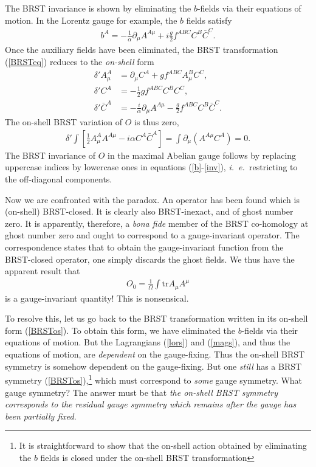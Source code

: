 \documentclass[a4paper,a4paper]{article}
\begin{document}
The BRST invariance is shown by eliminating the $b$-fields via their equations of motion. In the Lorentz gauge for example, the $b$ fields satisfy 
\begin{gather} \label{b}
b^A = -\frac{1}{\alpha} \partial_{\mu} A^{A\mu} + i\frac{g}{2} f^{ABC} C^B \bar{C}^C.
\end{gather}
Once the auxiliary fields have been eliminated, the BRST transformation (\ref{BRSTeq}) reduces to the \emph{on-shell} form
\begin{align} \label{BRSTos}
\delta' A^{A}_{\mu} &= \partial_{\mu} C^{A} + g f^{ABC} A^{B}_{\mu} C^{C}, \nonumber \\
\delta' C^{A} &= -\frac{1}{2} g f^{ABC} C^{B}C^{C}, \nonumber \\
\delta' \bar{C}^{A} &=  -\frac{i}{\alpha} \partial_{\mu} A^{A\mu} - \frac{g}{2} f^{ABC} C^B \bar{C}^C.
\end{align}
The on-shell BRST variation of $O$ is thus zero,
\begin{gather} \label{inv}
\delta'  \int 
\left[ \frac{1}{2} A_{\mu}^{A}  A^{A \mu} - i \alpha  C^A \bar{C}^A \right]
= \int \partial_{\mu} (A^{A\mu} C^A) = 0.
\end{gather}
The BRST invariance of $O$ in the maximal Abelian gauge follows by replacing uppercase indices by lowercase ones in equations (\ref{b}-\ref{inv}), \emph{i.\ e.\ }restricting to the off-diagonal components.

Now we are confronted with the paradox. An operator has been found which is (on-shell) BRST-closed. It is clearly also BRST-inexact, and of ghost number zero. It is apparently, therefore, a \emph{bona fide} member of the BRST co-homology at ghost number zero and ought to correspond to a gauge-invariant operator. The correspondence states \cite{Henneaux:1992ig} that to obtain the gauge-invariant function from the BRST-closed operator, one simply discards the ghost fields. We thus have the apparent result that
\begin{gather} \label{gi}
O_0 = \frac{1}{\Omega} \int \mathrm{tr} A_{\mu} A^{\mu}
\end{gather}
is a gauge-invariant quantity! This is nonsensical.

To resolve this, let us go back to the BRST transformation written in its on-shell form (\ref{BRSTos}). To obtain this form, we have eliminated the $b$-fields via their equations of motion. But the Lagrangians (\ref{lors}) and (\ref{mags}), and thus the equations of motion, are \emph{dependent} on the gauge-fixing. Thus the on-shell BRST symmetry is somehow dependent on the gauge-fixing. But one \emph{still} has a BRST symmetry (\ref{BRSTos}),\footnote{It is straightforward to show that the on-shell action obtained by eliminating the $b$ fields is closed under the on-shell BRST transformation} which must correspond to \emph{some} gauge symmetry. What gauge symmetry? The answer must be that \emph{the on-shell BRST symmetry corresponds to the residual gauge symmetry which remains after the gauge has been partially fixed}.
\end{document}
